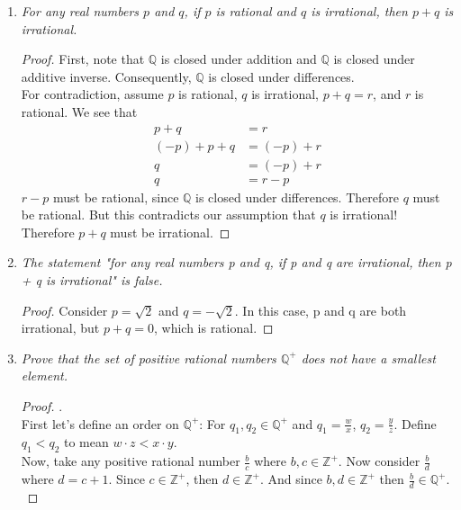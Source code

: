 \documentclass{amsart}
\begin{document}
\begin{enumerate}[1.]
\newpage

\item \emph{For any real numbers $p$ and $q$, if $p$ is rational and 
$q$ is irrational, then $p + q$ is irrational.}
\begin{proof}
First, note that $\mathbb{Q}$ is closed under addition and $\mathbb{Q}$ 
is closed under additive inverse. Consequently, $\mathbb{Q}$ is 
closed under differences. \\

For contradiction, assume $p$ is rational, $q$ is irrational, 
$p + q = r$, and $r$ is rational. We see that
\begin{align*}
    p + q &= r \\
    (-p) + p + q &= (-p) + r \\
    q &= (-p) + r \\
    q &= r - p
\end{align*}
$r - p$ must be rational, since $\mathbb{Q}$ is closed under differences.
Therefore $q$ must be rational. But this contradicts our assumption that
$q$ is irrational! Therefore $p + q$ must be irrational.
\end{proof}


\newpage

\item \emph{The statement "for any real numbers p and q, if p and q are irrational, then p + q is irrational" is false.}
\begin{proof}
Consider $p = \sqrt{2}$ and $q = -\sqrt{2}$. In this case, p and q are 
both irrational, but $p + q = 0$, which is rational.

\end{proof}


\newpage

\item \emph{Prove that the set of positive rational numbers $\mathbb{Q}^+$ does not have a smallest element.}
\begin{proof} .\\

First let's define an order on $\mathbb{Q}^+$:
For $q_1, q_2\in\mathbb{Q}^+$ and $q_1=\frac{w}{x}$, 
$q_2=\frac{y}{z}$. Define $q_1 < q_2$ to mean $w\cdot z < x\cdot y$. \\

Now, take any positive rational number $\frac{b}{c}$ 
where $b,c\in\mathbb{Z}^+$. Now consider $\frac{b}{d}$ where $d=c+1$. 
Since $c\in\mathbb{Z}^+$, then $d\in\mathbb{Z}^+$. And since 
$b,d\in\mathbb{Z}^+$ then $\frac{b}{d}\in\mathbb{Q}^+$. \\


\end{proof}
\end{enumerate}
\end{document}

